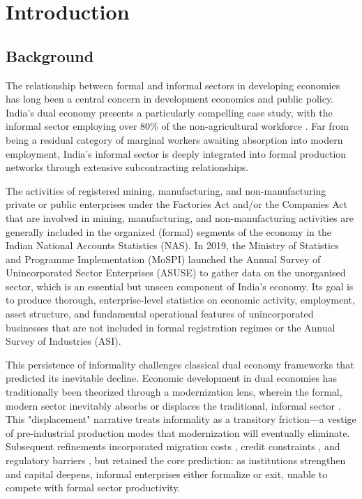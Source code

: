 \chapter{Introduction}\label{chap:introduction}

\section{Background}

The relationship between formal and informal sectors in developing economies has long been a central concern in development economics and public policy. India's dual economy presents a particularly compelling case study, with the informal sector employing over 80\% of the non-agricultural workforce \autocite{ILO2022}. Far from being a residual category of marginal workers awaiting absorption into modern employment, India's informal sector is deeply integrated into formal production networks through extensive subcontracting relationships.

The activities of registered mining, manufacturing, and non-manufacturing private or public enterprises under the Factories Act and/or the Companies Act that are involved in mining, manufacturing, and non-manufacturing activities are generally included in the organized (formal) segments of the economy in the Indian National Accounts Statistics (NAS). In 2019, the Ministry of Statistics and Programme Implementation (MoSPI) launched the Annual Survey of Unincorporated Sector Enterprises (ASUSE) to gather data on the unorganised sector, which is an essential but unseen component of India's economy. Its goal is to produce thorough, enterprise-level statistics on economic activity, employment, asset structure, and fundamental operational features of unincorporated businesses that are not included in formal registration regimes or the Annual Survey of Industries (ASI).

This persistence of informality challenges classical dual economy frameworks that predicted its inevitable decline. Economic development in dual economies has traditionally been theorized through a modernization lens, wherein the formal, modern sector inevitably absorbs or displaces the traditional, informal sector \autocite{Lewis1954}. This "displacement" narrative treats informality as a transitory friction—a vestige of pre-industrial production modes that modernization will eventually eliminate. Subsequent refinements incorporated migration costs \autocite{Harris1970}, credit constraints \autocite{Evans1989}, and regulatory barriers \autocite{Rauch1991}, but retained the core prediction: as institutions strengthen and capital deepens, informal enterprises either formalize or exit, unable to compete with formal sector productivity.

